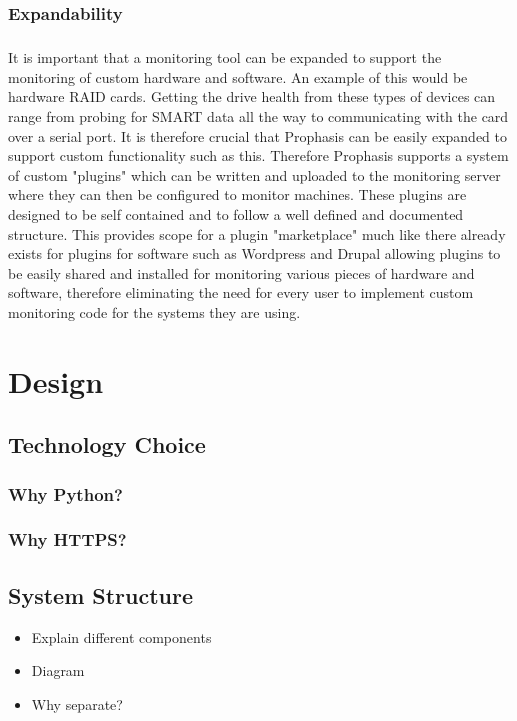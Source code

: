 \documentclass[bsc,logo,twoside]{infthesis}
\begin{document}
\subsection{Expandability}
\paragraph*{}
	It is important that a monitoring tool can be expanded to support the
	monitoring of custom hardware and software.  An example of this would be
	hardware RAID cards.  Getting the drive health from these types of devices
	can range from probing for SMART data all the way to communicating with the
	card over a serial port.  It is therefore crucial that Prophasis can be
	easily expanded to support custom functionality such as this. Therefore 
	Prophasis supports a system of custom "plugins" which can be written and
	uploaded to the monitoring server where they can then be configured to monitor
	machines. These plugins are designed to be self contained and to follow a well
	defined and documented structure.  This provides scope for a plugin
	"marketplace" much like there already exists for plugins for software such as
	Wordpress and Drupal allowing plugins to be easily shared and installed for
	monitoring various pieces of hardware and software, therefore eliminating the
	need for every user to implement custom monitoring code for the systems they
	are using.
	
\chapter{Design}
\section{Technology Choice}
\subsection{Why Python?}
\subsection{Why HTTPS?}

\section{System Structure}
\begin{itemize}
	\item Explain different components
	\item Diagram
	\item Why separate?
\end{itemize}
\end{document}
